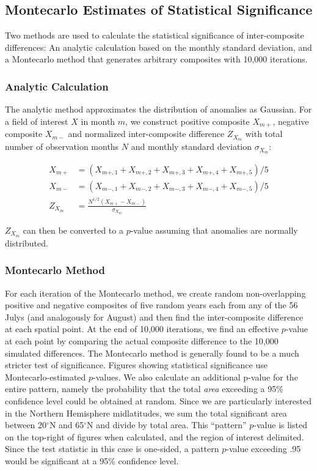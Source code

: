 	
\subsection{Montecarlo Estimates of Statistical Significance}	
	
	Two methods are used to calculate the statistical significance of inter-composite differences: An analytic calculation based on the monthly standard deviation, and a Montecarlo method that generates arbitrary composites with 10,000 iterations. 

\subsubsection{Analytic Calculation}	
	
	The analytic method approximates the distribution of anomalies as Gaussian. For a field of interest $X$ in month $m$, we construct positive composite $X_{m+}$, negative composite $X_{m-}$ and normalized inter-composite difference $Z_{X_m}$ with total number of observation months $N$ and monthly standard deviation $\sigma_{X_m}$:
	
\begin{align*}
	X_{m+} &= \left(X_{m+,1}+X_{m+,2}+X_{m+,3}+X_{m+,4}+X_{m+,5}\right)/5 \\
	X_{m-} &= \left(X_{m-,1}+X_{m-,2}+X_{m-,3}+X_{m-,4}+X_{m-,5}\right)/5 \\
	Z_{X_m} &= \frac{N^{1/2}\left(X_{m+} - X_{m-}\right)}{\sigma_{X_m}}
\end{align*}

	$Z_{X_m}$ can then be converted to a $p$-value assuming that anomalies are normally distributed.

\subsubsection{Montecarlo Method}	
	
	For each iteration of the Montecarlo method, we create random non-overlapping positive and negative composites of five random years each from any of the 56 Julys (and analogously for August) and then find the inter-composite difference at each spatial point. At the end of 10,000 iterations, we find an effective $p$-value at each point by comparing the actual composite difference to the 10,000 simulated differences. The Montecarlo method is generally found to be a much stricter test of significance. Figures showing statistical significance use Montecarlo-estimated $p$-values. We also calculate an additional p-value for the entire pattern, namely the probability that the total \textit{area} exceeding a 95\% confidence level could be obtained at random. Since we are particularly interested in the Northern Hemisphere midlatitudes, we sum the total significant area between 20$^{\circ}$N and 65$^{\circ}$N and divide by total area. This ``pattern'' $p$-value is listed on the top-right of figures when calculated, and the region of interest delimited. Since the test statistic in this case is one-sided, a pattern $p$-value exceeding .95 would be significant at a 95\% confidence level.

